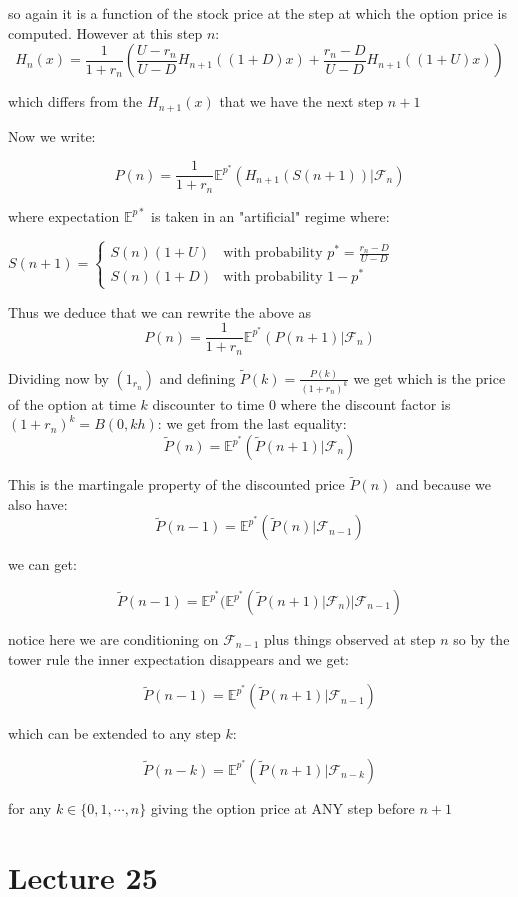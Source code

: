 \documentclass[oneside]{book}
\begin{document}
so again it is a function of the stock price at the step at which the option price is
computed. However at this step $n$:
\begin{equation*}
    H_n(x) = \frac{1}{1+r_n} \left(\frac{U-r_n}{U-D}H_{n+1}((1+D)x) + \frac{r_n - D}{U-D}H_{n+1}
    ((1+U)x)\right)
\end{equation*}

which differs from the $H_{n+1}(x)$ that we have the next step $n+1$

Now we write:

$$
P(n) = \frac{1}{1+r_n}\mathbb{E}^{p^*}(H_{n+1}(S(n+1)) |\mathcal{F}_n)
$$

where expectation $\mathbb{E}^{p*}$ is taken in an "artificial" regime where:


$S(n+1)=\begin{cases}
S(n)(1+U) & \text{with probability } p^* = \frac{r_n-D}{U-D} \\
S(n)(1+D)  & \text{with probability } 1-p^*
\end{cases}$


Thus we deduce that we can rewrite the above as
$$
P(n) = \frac{1}{1+r_n}\mathbb{E}^{p^*}(P(n+1)|\mathcal{F}_n)
$$

Dividing now by $(1_{r_n})$ and defining $\tilde{P}(k) = \frac{P(k)}{(1+r_n)^k}$ we get
which is the price of the option at time $k$ discounter to time $0$ where the discount
factor is $(1+r_n)^k = B(0, kh)$:
we get from the last equality:
\begin{equation*}
    \tilde{P}(n) = \mathbb{E}^{p^*}(\tilde{P}(n+1)|\mathcal{F}_n)
\end{equation*}

{\color{red} This is the martingale property of the discounted price $\tilde{P}(n)$}
and because we also have:
$$
\tilde{P}(n-1) = \mathbb{E}^{p^*}(\tilde{P}(n)|\mathcal{F}_{n-1})
$$

we can get:

$$
    \tilde{P}(n-1) = \mathbb{E}^{p^*}( \mathbb{E}^{p^*}(\tilde{P}(n+1)|\mathcal{F}_n)
 | \mathcal{F}_{n-1})
$$

notice here we are conditioning on $\mathcal{F}_{n-1}$ plus things observed at step $n$
so by the tower rule the inner expectation disappears and we get:

$$
    \tilde{P}(n-1) = \mathbb{E}^{p^*}(\tilde{P}(n+1)|\mathcal{F}_{n-1})
$$

which can be extended to any step $k$:

$$
    \tilde{P}(n-k) = \mathbb{E}^{p^*}(\tilde{P}(n+1)|\mathcal{F}_{n-k})
$$

for any $k \in \{0, 1, \cdots, n\}$ giving the option price
at ANY step before $n+1$

\section{Lecture 25}
\end{document}

